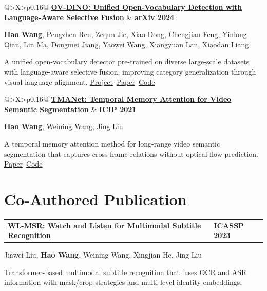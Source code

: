 \documentclass[10pt,letterpaper]{article}
\makeatletter
\newcommand{\venue}[1]{\textcolor{accent}{\footnotesize\bfseries #1}}
\newcommand{\sep}{{\color{rule}\;\textbar\;}}
\newcommand{\publication}[5]{%
  \par\addvspace{2pt}
  \noindent\begin{minipage}{\linewidth}
  \begin{tabularx}{\textwidth}{@{}>{\RaggedRight\arraybackslash}X>{\RaggedLeft\arraybackslash}p{0.16\textwidth}@{}}
    \textbf{\href{#1}{\textcolor{ink}{#2}}} & \venue{#3}
  \end{tabularx}\par
  \vspace{-1pt}
  {\small #4}\par
  \vspace{1pt}
  \textcolor{muted}{\small #5}\par
  \end{minipage}\par
  \vspace{6pt}
}
\makeatother
\begin{document}
\publication
  {https://wanghao9610.github.io/OV-DINO/}
  {OV-DINO: Unified Open-Vocabulary Detection with Language-Aware Selective Fusion}
  {arXiv 2024}
  {\textbf{Hao Wang}, Pengzhen Ren, Zequn Jie, Xiao Dong, Chengjian Feng, Yinlong Qian, Lin Ma, Dongmei Jiang, Yaowei Wang, Xiangyuan Lan, Xiaodan Liang}
  {A unified open-vocabulary detector pre-trained on diverse large-scale datasets with language-aware selective fusion, improving category generalization through visual-language alignment. \mbox{\href{https://wanghao9610.github.io/OV-DINO/}{Project} \sep \href{https://arxiv.org/abs/2407.07844}{Paper} \sep \href{https://github.com/wanghao9610/OV-DINO}{Code}}}

\publication
  {https://arxiv.org/abs/2102.08643}
  {TMANet: Temporal Memory Attention for Video Semantic Segmentation}
  {ICIP 2021}
  {\textbf{Hao Wang}, Weining Wang, Jing Liu}
  {A temporal memory attention method for long-range video semantic segmentation that captures cross-frame relations without optical-flow prediction. \mbox{\href{https://arxiv.org/abs/2102.08643}{Paper} \sep \href{https://github.com/wanghao9610/TMANet}{Code}}}

\section{Co-Authored Publication}
\publication
  {https://ieeexplore.ieee.org/abstract/document/10096063}
  {WL-MSR: Watch and Listen for Multimodal Subtitle Recognition}
  {ICASSP 2023}
  {Jiawei Liu, \textbf{Hao Wang}, Weining Wang, Xingjian He, Jing Liu}
  {Transformer-based multimodal subtitle recognition that fuses OCR and ASR information with mask/crop strategies and multi-level identity embeddings.}

\newpage
\end{document}
